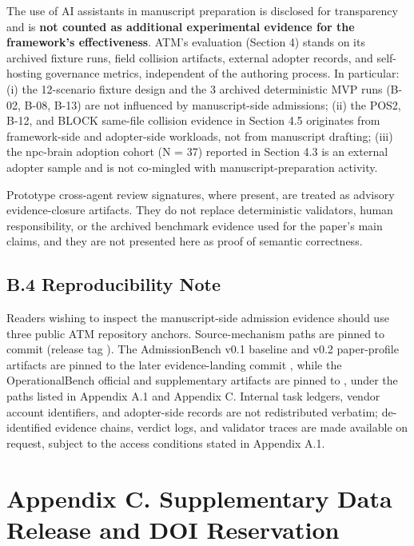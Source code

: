 \documentclass[9pt,letterpaper]{extarticle}
\begin{document}
The use of AI assistants in manuscript preparation is disclosed for transparency and is \textbf{not counted as additional experimental evidence for the framework's effectiveness}. ATM's evaluation (Section 4) stands on its archived fixture runs, field collision artifacts, external adopter records, and self-hosting governance metrics, independent of the authoring process. In particular: (i) the 12-scenario fixture design and the 3 archived deterministic MVP runs (B-02, B-08, B-13) are not influenced by manuscript-side admissions; (ii) the POS2, B-12, and BLOCK same-file collision evidence in Section 4.5 originates from framework-side and adopter-side workloads, not from manuscript drafting; (iii) the npc-brain adoption cohort (N = 37) reported in Section 4.3 is an external adopter sample and is not co-mingled with manuscript-preparation activity.

Prototype cross-agent review signatures, where present, are treated as advisory evidence-closure artifacts. They do not replace deterministic validators, human responsibility, or the archived benchmark evidence used for the paper's main claims, and they are not presented here as proof of semantic correctness.

\subsection*{B.4 Reproducibility Note}

Readers wishing to inspect the manuscript-side admission evidence should use three public ATM repository anchors. Source-mechanism paths are pinned to commit \texttt{} (release tag \texttt{}). The AdmissionBench v0.1 baseline and v0.2 paper-profile artifacts are pinned to the later evidence-landing commit \texttt{}, while the OperationalBench official and supplementary artifacts are pinned to \texttt{}, under the paths listed in Appendix A.1 and Appendix C. Internal task ledgers, vendor account identifiers, and adopter-side records are not redistributed verbatim; de-identified evidence chains, verdict logs, and validator traces are made available on request, subject to the access conditions stated in Appendix A.1.

\section*{Appendix C. Supplementary Data Release and DOI Reservation}
\end{document}
